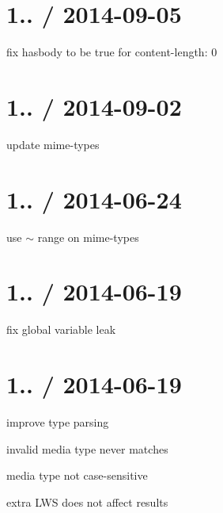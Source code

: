 \section*{1.. / 2014-\/09-\/05 }


\begin{DoxyItemize}
\item fix {\ttfamily hasbody} to be true for {\ttfamily content-\/length\+: 0}
\end{DoxyItemize}

\section*{1.. / 2014-\/09-\/02 }


\begin{DoxyItemize}
\item update mime-\/types
\end{DoxyItemize}

\section*{1.. / 2014-\/06-\/24 }


\begin{DoxyItemize}
\item use {\ttfamily $\sim$} range on mime-\/types
\end{DoxyItemize}

\section*{1.. / 2014-\/06-\/19 }


\begin{DoxyItemize}
\item fix global variable leak
\end{DoxyItemize}

\section*{1.. / 2014-\/06-\/19 }


\begin{DoxyItemize}
\item improve type parsing
\begin{DoxyItemize}
\item invalid media type never matches
\item media type not case-\/sensitive
\item extra L\+WS does not affect results
\end{DoxyItemize}
\end{DoxyItemize}


